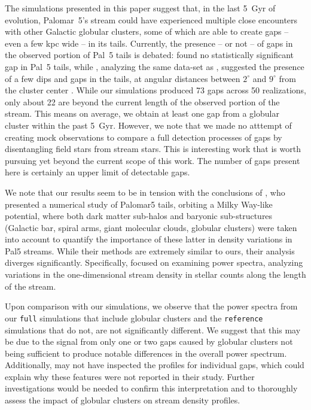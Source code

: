 \documentclass{aa}
\begin{document}
  The simulations presented in this paper suggest that, in the last 5~Gyr of evolution, Palomar~5's stream could have experienced multiple close encounters with other Galactic globular clusters, some of which are able to create gaps -- even a few kpc wide -- in its tails. Currently, the presence -- or not -- of gaps in the observed portion of Pal~5 tails is debated: \citet{2016ApJ...819....1I} found no statistically significant gap in Pal~5 tails, while \citet{2017MNRAS.470...60E}, analyzing the same data-set as \citet{2016ApJ...819....1I}, suggested the presence of a few dips and gaps in the tails, at angular distances between $2^\circ$ and $9^\circ$ from the cluster center \citep[see also][]{ 2020ApJ...889...70B}. While our simulations produced 73 gaps across 50 realizations, only about 22 are beyond the current length of the observed portion of the stream. This means on average, we obtain at least one gap from a globular cluster within the past 5~Gyr. However, we note that we made no atttempt of creating mock observations to compare a full detection processes of gaps by disentangling field stars from stream stars. This is interesting work that is worth pursuing yet beyond the current scope of this work. The number of gaps present here is certainly an upper limit of detectable gaps. 
  
  We note that our results seem to be in tension with the conclusions of \citet{2019MNRAS.484.2009B}, who presented a numerical study of Palomar5 tails, orbiting a Milky Way-like potential, where both dark matter sub-halos and baryonic sub-structures (Galactic bar, spiral arms, giant molecular clouds, globular clusters) were taken into account to quantify the importance of these latter in density variations in Pal5 streams. While their methods are extremely similar to ours, their analysis diverges significantly. Specifically, \citet{2019MNRAS.484.2009B} focused on examining power spectra, analyzing variations in the one-dimensional stream density in stellar counts along the length of the stream. 

  Upon comparison with our simulations, we observe that the power spectra from our \texttt{full} simulations that include globular clusters and the \texttt{reference} simulations that do not, are not significantly different. We suggest that this may be due to the signal from only one or two gaps caused by globular clusters not being sufficient to produce notable differences in the overall power spectrum. Additionally, \citet{2022ApJ...926..107M} may not have inspected the profiles for individual gaps, which could explain why these features were not reported in their study. Further investigations would be needed to confirm this interpretation and to thoroughly assess the impact of globular clusters on stream density profiles. \\
\end{document}
